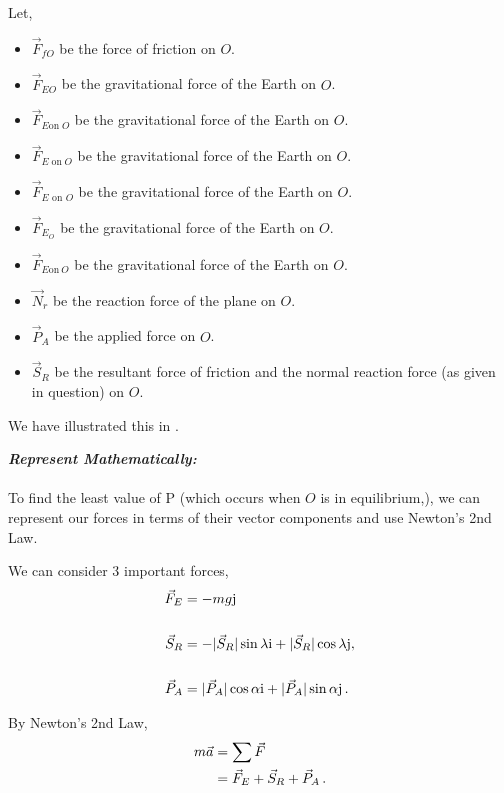 \begin{subquestions}
\begin{subsubquestions}
	Let,  
	\begin{itemize}
		\item $\vec{F}_{fO}$ be the force of friction on $O$.
		\item $\vec{F}_{EO}$ be the gravitational force of the Earth on $O$.
		\item $\vec{F}_{E \text{on} \; O}$ be the gravitational force of the Earth on $O$.
		\item $\vec{F}_{E \; \text{on} \; O}$ be the gravitational force of the Earth on $O$.
		\item $\vec{F}_{E \text{ on }O}$ be the gravitational force of the Earth on $O$.
		\item $\vec{F}_{E_O}$ be the gravitational force of the Earth on $O$.
		\item $\vec{F}_{E \text{on} ~O}$ be the gravitational force of the Earth on $O$.
		\item $\vec{N}_{r}$ be the reaction force of the plane on $O$.
		\item $\vec{P}_{A}$ be the applied force on $O$.
		\item $\vec{S}_{R}$ be the resultant force of friction and the normal reaction force (as given in question) on $O$.
	\end{itemize}

	We have illustrated this in .
	
	
	
	\textbf{\textit{Represent Mathematically:}} \\ \\
	To find the least value of P (which occurs when $O$ is in equilibrium,), we can represent our forces in terms of their vector components and use Newton's 2nd Law.
	
	We can consider 3 important forces,
	\begin{align}
		\vec{F}_{E} & = -mg\mathrm{j} \\ \nonumber \\
		\vec{S}_{R} & = -|\vec{S}_{R}|\sin{\lambda}\mathrm{i} +|\vec{S}_{R}|\cos{\lambda}\mathrm{j} ,\\ \nonumber \\
		\vec{P}_{A} & = |\vec{P}_{A}|\cos{\alpha}\mathrm{i} + |\vec{P}_{A}|\sin{\alpha}\mathrm{j}  \,.
	\end{align}

	By Newton's 2nd Law,
	\begin{align}
		m\vec{a} & = \sum{\vec{F}} \nonumber \\
		         & = \vec{F}_{E} + \vec{S}_{R} + \vec{P}_{A} \,.
	\end{align}


\end{subsubquestions}
\end{subquestions}
